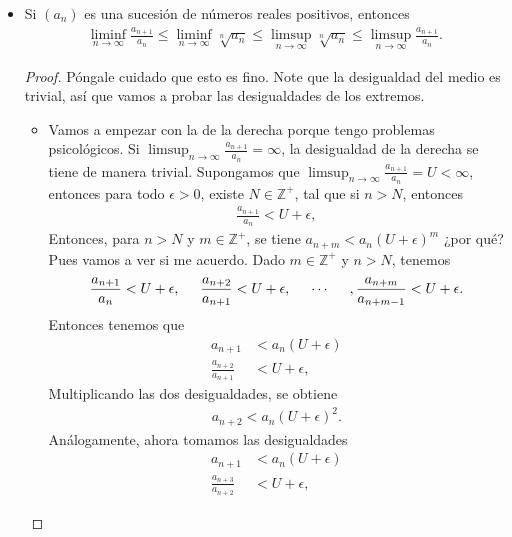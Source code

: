\begin{itemize}[leftmargin=*]
\item Si $(a_n)$ es una sucesión de números reales positivos, entonces
\begin{align*}
    \liminf_{n\to \infty} \frac{a_{n+1}}{a_n}\leq \liminf_{n \to \infty} \sqrt[n]{a_n}\leq \limsup_{n\to \infty} \sqrt[n]{a_n}\leq \limsup_{n\to \infty} \frac{a_{n+1}}{a_n}.
\end{align*}
\begin{proof}
    Póngale cuidado que esto es fino. Note que la desigualdad del medio es trivial, así que vamos a probar las desigualdades de los extremos.
    \begin{itemize}
        \item Vamos a empezar con la de la derecha porque tengo problemas psicológicos. Si $\displaystyle \limsup_{n\to \infty}\frac{a_{n+1}}{a_n}=\infty$, la desigualdad de la derecha se tiene de manera trivial. Supongamos que $\displaystyle \limsup_{n\to \infty}\frac{a_{n+1}}{a_n}=U<\infty$, entonces para todo $\epsilon>0$, existe $N\in \mathbb{Z}^+$, tal que si $n>N$, entonces 
        \begin{align*}
            \frac{a_{n+1}}{a_n}<U+\epsilon,
        \end{align*}
        Entonces, para $n>N$ y $m \in \mathbb{Z}^+$, se tiene $a_{n+m}<a_n(U+\epsilon)^m$ ¿por qué? Pues vamos a ver si me acuerdo. Dado $m \in \mathbb{Z}^+$ y $n>N$, tenemos
        \begin{align*}
            \frac{a_{n+1}}{a_n}<U+\epsilon, \hspace{5mm} \frac{a_{n+2}}{a_{n+1}}<U+\epsilon, \hspace{5mm} \dotsb \hspace{5mm}, \frac{a_{n+m}}{a_{n+m-1}}<U+\epsilon.
        \end{align*}
        Entonces tenemos que 
        \begin{align*}
            a_{n+1}&<a_n(U+\epsilon)\\
            \frac{a_{n+2}}{a_{n+1}}&<U+\epsilon,
        \end{align*}
        Multiplicando las dos desigualdades, se obtiene
        \begin{align*}
            a_{n+2}<a_n(U+\epsilon)^2.
        \end{align*}
        Análogamente, ahora tomamos las desigualdades
        \begin{align*}
            a_{n+1}&<a_n(U+\epsilon)\\
            \frac{a_{n+3}}{a_{n+2}}&<U+\epsilon,
        \end{align*}

\end{itemize}
\end{proof}
\end{itemize}
